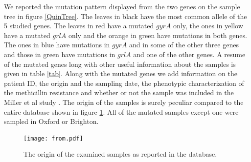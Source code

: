 \documentclass[12pt,a4paper]{article}
\begin{document}
We reported the mutation pattern displayed from the two genes on the sample tree in figure \ref{QuinTree}. The leaves in black have the most common allele of the 5 studied genes. The leaves in red have a mutated $gyrA$ only, the ones in yellow have a mutated $grlA$ only and the orange in green have mutations in both genes. The ones in blue have mutations in $gyrA$ and in some of the other three genes and those in green have mutations in $grlA$ and one of the other genes.
A resume of the mutated genes long with other useful information about the samples is given in table \ref{tab}. Along with the mutated genes we add information on the patient ID, the origin and the sampling date, the phenotypic characterization of the methicillin resistance and whether or not the sample was included in the Miller et al study \cite{Miller}. The origin of the samples is surely peculiar compared to the entire database shown in figure \ref{fig:from}. All of the mutated samples except one were sampled in Oxford or Brighton. 


\begin{figure}[hb]
  \centering
  \texttt{[image: from.pdf]}
  \caption[Tree]
   {The origin of the examined samples as reported in the database.}\label{fig:from}
\end{figure}
\end{document}
